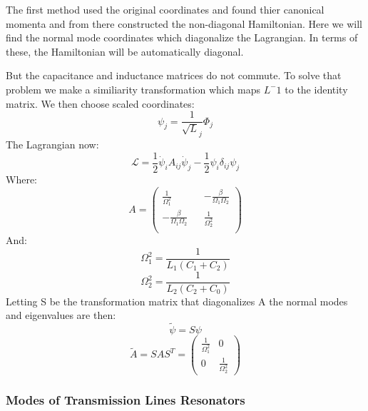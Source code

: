\documentclass[12pt]{article}
\numberwithin{equation}{subsection}
\newcommand\page[1]{
{
}
}
\begin{document}
The first method used the original coordinates and found thier canonical momenta and from there constructed the non-diagonal Hamiltonian. Here we will find the normal mode coordinates which diagonalize the Lagrangian. In terms of these, the Hamiltonian will be automatically diagonal. 

\page{25}

But the capacitance and inductance matrices do not commute. To solve that problem we make a similiarity transformation which maps $L^-1$ to the identity matrix. We then choose scaled coordinates:
\begin{equation}
    \psi_j = \frac{1}{\sqrt L_j} \Phi_j
\end{equation}
The Lagrangian now:
\begin{equation}
   \mathcal{L} = \frac{1}{2}\dot \psi_iA_{ij}\dot\psi_j-\frac{1}{2} \psi_i\delta_{ij}\psi_j 
\end{equation}
Where:
\begin{equation}
   A= \begin{pmatrix}
   \frac{1}{\Omega_1^2} && -\frac{\beta}{\Omega_1\Omega_2}\\
 -\frac{\beta}{\Omega_1\Omega_2}  && \frac{1}{\Omega_2^2} \\
    \end{pmatrix}
\end{equation}
And:
\begin{equation}
    \Omega^2_1 = \frac{1}{L_1(C_1+C_2)}
\end{equation}
\begin{equation}
    \Omega^2_2 = \frac{1}{L_2(C_2+C_0)}
\end{equation}
Letting S be the transformation matrix that diagonalizes A the normal modes and eigenvalues are then:
\begin{equation}
    \tilde \psi = S \psi 
\end{equation}
\begin{equation}
    \tilde A = S A S^T = \begin{pmatrix}
    \frac{1}{\Omega^2_1} & 0\\
    0 & \frac{1}{\Omega^2_2}
    \end{pmatrix}
\end{equation}

\page{26}

\subsubsection{Modes of Transmission Lines Resonators}
\end{document}
